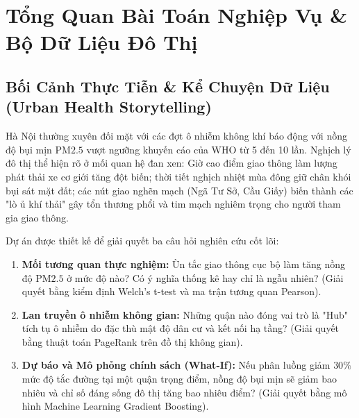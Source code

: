 \documentclass[11pt,a4paper]{article}
\begin{document}
\section{Tổng Quan Bài Toán Nghiệp Vụ \& Bộ Dữ Liệu Đô Thị}

\subsection{Bối Cảnh Thực Tiễn \& Kể Chuyện Dữ Liệu (Urban Health Storytelling)}
Hà Nội thường xuyên đối mặt với các đợt ô nhiễm không khí báo động với nồng độ bụi mịn $\text{PM2.5}$ vượt ngưỡng khuyến cáo của WHO từ 5 đến 10 lần. Nghịch lý đô thị thể hiện rõ ở mối quan hệ đan xen: Giờ cao điểm giao thông làm lượng phát thải xe cơ giới tăng đột biến; thời tiết nghịch nhiệt mùa đông giữ chân khói bụi sát mặt đất; các nút giao nghẽn mạch (Ngã Tư Sở, Cầu Giấy) biến thành các "lò ủ khí thải" gây tổn thương phổi và tim mạch nghiêm trọng cho người tham gia giao thông.

Dự án được thiết kế để giải quyết ba câu hỏi nghiên cứu cốt lõi:
\begin{enumerate}
    \item \textbf{Mối tương quan thực nghiệm:} Ùn tắc giao thông cục bộ làm tăng nồng độ $\text{PM2.5}$ ở mức độ nào? Có ý nghĩa thống kê hay chỉ là ngẫu nhiên? (Giải quyết bằng kiểm định Welch's t-test và ma trận tương quan Pearson).
    \item \textbf{Lan truyền ô nhiễm không gian:} Những quận nào đóng vai trò là "Hub" tích tụ ô nhiễm do đặc thù mật độ dân cư và kết nối hạ tầng? (Giải quyết bằng thuật toán PageRank trên đồ thị không gian).
    \item \textbf{Dự báo và Mô phỏng chính sách (What-If):} Nếu phân luồng giảm $30\%$ mức độ tắc đường tại một quận trọng điểm, nồng độ bụi mịn sẽ giảm bao nhiêu và chỉ số đáng sống đô thị tăng bao nhiêu điểm? (Giải quyết bằng mô hình Machine Learning Gradient Boosting).
\end{enumerate}
\end{document}
